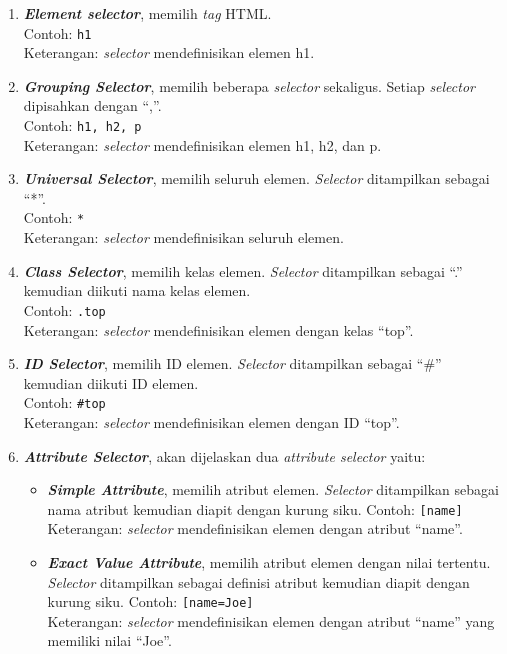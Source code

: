 \begin{enumerate}
	\item \textit{\textbf{Element selector}}, memilih \textit{tag} HTML.\\
		Contoh: \texttt{h1}\\
		Keterangan: \textit{selector} mendefinisikan elemen h1.
	\item \textit{\textbf{Grouping Selector}}, memilih beberapa \textit{selector} sekaligus. Setiap \textit{selector} dipisahkan dengan ``,''.\\
		Contoh: \texttt{h1, h2, p}\\
		Keterangan: \textit{selector} mendefinisikan elemen h1, h2, dan p.
	\item \textit{\textbf{Universal Selector}}, memilih seluruh elemen. \textit{Selector} ditampilkan sebagai ``*''.\\
		Contoh: \texttt{*}\\
		Keterangan: \textit{selector} mendefinisikan seluruh elemen.
	\item \textit{\textbf{Class Selector}}, memilih kelas elemen. \textit{Selector} ditampilkan sebagai ``.'' kemudian diikuti nama kelas elemen.\\
		Contoh: \texttt{.top}\\
		Keterangan: \textit{selector} mendefinisikan elemen dengan kelas ``top''.
	\item \textit{\textbf{ID Selector}}, memilih ID elemen. \textit{Selector} ditampilkan sebagai ``\#'' kemudian diikuti ID elemen.\\
		Contoh: \texttt{\#top}\\
		Keterangan: \textit{selector} mendefinisikan elemen dengan ID ``top''. 
	\item \textit{\textbf{Attribute Selector}}, akan dijelaskan dua \textit{attribute selector} yaitu:
		\begin{itemize}
			\item \textit{\textbf{Simple Attribute}}, memilih atribut elemen. \textit{Selector} ditampilkan sebagai nama atribut kemudian diapit dengan kurung siku.
			Contoh: \texttt{[name]}\\
			Keterangan: \textit{selector} mendefinisikan elemen dengan atribut ``name''. 
			
			\item \textit{\textbf{Exact Value Attribute}}, memilih atribut elemen dengan nilai tertentu. \textit{Selector} ditampilkan sebagai definisi atribut kemudian diapit dengan kurung siku.
			Contoh: \texttt{[name=Joe]}\\
			Keterangan: \textit{selector} mendefinisikan elemen dengan atribut ``name'' yang memiliki nilai ``Joe''. 
		\end{itemize}
		

\end{enumerate}
